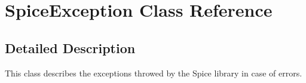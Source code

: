 \hypertarget{class_s_p_i_c_e_1_1_spice_exception}{}\section{Spice\+Exception Class Reference}
\label{class_s_p_i_c_e_1_1_spice_exception}


\subsection{Detailed Description}
This class describes the exceptions throwed by the Spice library in case of errors. 